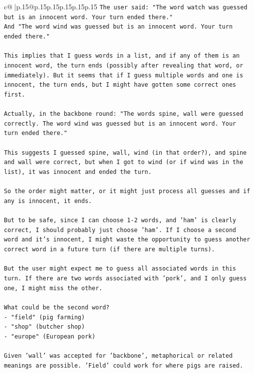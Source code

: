 \documentclass{article}
\begin{document}
{\begin{supertabular}{c@{$\;$}|p{.15\linewidth}@{}p{.15\linewidth}p{.15\linewidth}p{.15\linewidth}p{.15\linewidth}p{.15\linewidth}}
{{{\texttt{The user said: "The word watch was guessed but is an innocent word. Your turn ended there."} \\
\texttt{And "The word wind was guessed but is an innocent word. Your turn ended there."} \\
\\ 
\texttt{This implies that I guess words in a list, and if any of them is an innocent word, the turn ends (possibly after revealing that word, or immediately). But it seems that if I guess multiple words and one is innocent, the turn ends, but I might have gotten some correct ones first.} \\
\\ 
\texttt{Actually, in the backbone round: "The words spine, wall were guessed correctly. The word wind was guessed but is an innocent word. Your turn ended there."} \\
\\ 
\texttt{This suggests I guessed spine, wall, wind (in that order?), and spine and wall were correct, but when I got to wind (or if wind was in the list), it was innocent and ended the turn.} \\
\\ 
\texttt{So the order might matter, or it might just process all guesses and if any is innocent, it ends.} \\
\\ 
\texttt{But to be safe, since I can choose 1{-}2 words, and 'ham' is clearly correct, I should probably just choose 'ham'. If I choose a second word and it's innocent, I might waste the opportunity to guess another correct word in a future turn (if there are multiple turns).} \\
\\ 
\texttt{But the user might expect me to guess all associated words in this turn. If there are two words associated with 'pork', and I only guess one, I might miss the other.} \\
\\ 
\texttt{What could be the second word?} \\
\texttt{{-} "field" (pig farming)} \\
\texttt{{-} "shop" (butcher shop)} \\
\texttt{{-} "europe" (European pork)} \\
\\ 
\texttt{Given 'wall' was accepted for 'backbone', metaphorical or related meanings are possible. 'Field' could work for where pigs are raised.} \\
\\ 
}}}
\end{supertabular}}
\end{document}
